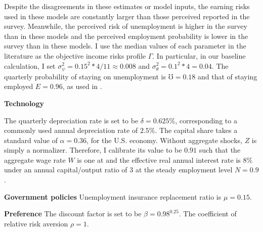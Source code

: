 Despite the disagreements in these estimates or model inputs, the earning risks used in these models are constantly larger than those perceived reported in the survey. Meanwhile, the perceived risk of unemployment is higher in the survey than in these models and the perceived employment probability is lower in the survey than in these models. I use the median values of each parameter in the literature as the objective income risks profile $\Gamma$. In particular, in our baseline calculation, I set $\sigma^2_\psi = 0.15^2*4/11 \approx 0.008$ and $\sigma^2_\theta = 0.1^2*4=0.04$. The quarterly probability of staying on unemployment is $\mho = 0.18$ and that of staying employed $E = 0.96$, as used in \cite{krueger2016macroeconomics}. 

\textbf{Technology} 


The quarterly depreciation rate is set to be $\delta =0.625\%$, corresponding to a commonly used annual depreciation rate of $2.5\%$. The capital share takes a standard value of $\alpha = 0.36$, for the U.S. economy. Without aggregate shocks, $Z$ is simply a normalizer. Therefore, I calibrate its value to be $0.91$ such that the aggregate wage rate $W$ is one at and the effective real annual interest rate is $8\%$ under an annual capital/output ratio of 3 at the steady employment level $N=0.9$. 

\textbf{Government policies} Unemployment insurance replacement ratio is $\mu=0.15$. 


\textbf{Preference} The discount factor is set to be $\beta=0.98^{0.25}$. The coefficient of relative risk aversion $\rho=1$. 

